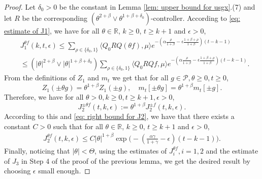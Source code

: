\documentclass[12pt,a4paper]{amsart}
\theoremstyle{plain}
\theoremstyle{definition}
\numberwithin{equation}{section}
\begin{document}
\begin{proof}
    Let $\delta_0 >0$ be the constant in Lemma \ref{lem: upper bound for usgx}.(7) and let $R$ be the corresponding $(\theta^{2+\beta}\vee \theta^{1+\beta+\delta_0})$-controller.
	According to \eqref{eq: estimate of J1}, we have for all $\theta\in \mathbb R$, $k\geq 0$, $t\geq k+1$ and $\epsilon> 0$,
\begin{equation}\begin{split}
	&J^{\theta f}_1(k,t,\epsilon)
     \leq \sum_{\rho \in \{\delta_0,1\}} \langle Q_0 RQ(\theta f), \mu \rangle e^{-(\alpha\frac{\rho}{1+\beta}-\epsilon\frac{1+\beta+\rho}{1+\beta})(t-k-1)}
     \\& \leq(|\theta|^{2+\beta}\vee |\theta|^{1+\beta+\delta_0}) \sum_{\rho \in \{\delta_0,1\}} \langle Q_0 RQf, \mu \rangle e^{-(\alpha\frac{\rho}{1+\beta}-\epsilon\frac{1+\beta+\rho}{1+\beta})(t-k-1)}.
\end{split}\end{equation}
	From the definitions of $Z_1$ and $m_t$ we get that for all $g\in \mathcal P, \theta \geq 0, t\geq 0$,
\[
	Z_1( \pm \theta g) = \theta^{1+\beta} Z_1(\pm g), \quad m_t[\pm \theta g] = \theta^{1+\beta} m_t[\pm g].
\]
	Therefore, we have for all $\theta >0, k \geq 0, t\geq k+1, \epsilon > 0$,
\[
J^{\pm \theta f}_2(t,k,\epsilon)
	:= \theta^{1+\beta} J_2^{\pm f}(t,k,\epsilon).
\]
		According to this and \eqref{eq: right bound for J2}, 
	we have that there exists a constant $C > 0$ such that for all $\theta\in \mathbb R$, $k\geq 0$, $t\geq k+1$ and $\epsilon> 0$,
\begin{equation}\begin{split}
\label{eq:31step3b}
    J^{\theta f}_2(t,k,\epsilon)
    \leq C |\theta|^{1+\beta}\exp\Big(-(\frac{\alpha\gamma}{1+\gamma}-\epsilon)(t-k-1)\Big).
\end{split}\end{equation}
	Finally, noticing that $|\theta| < \Theta$, using the estimates of $J^{\theta f}_{i}, i = 1,2$ and the estimate of $J_3$ in Step 4 of the proof of the previous lemma, we get the desired result by choosing $\epsilon$ small enough.
\end{proof}
\end{document}
